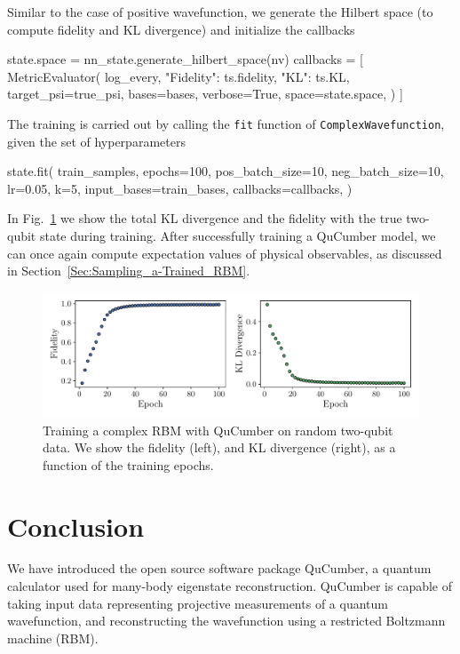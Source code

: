 \documentclass[submission, Phys, hidelnks]{SciPost}
\begin{document}
Similar to the case of positive wavefunction, we generate the Hilbert space (to
compute fidelity and KL divergence) and initialize the callbacks
\begin{python}
state.space = nn_state.generate_hilbert_space(nv)
callbacks = [
  MetricEvaluator(
    log_every,
    {"Fidelity": ts.fidelity, "KL": ts.KL},
    target_psi=true_psi,
    bases=bases,
    verbose=True,
    space=state.space,
  )
]

\end{python}
The training is carried out by calling the \verb|fit| function of
\verb|ComplexWavefunction|, given the set of hyperparameters
\begin{python}
state.fit(
    train_samples,
    epochs=100,
    pos_batch_size=10,
    neg_batch_size=10,
    lr=0.05,
    k=5,
    input_bases=train_bases,
    callbacks=callbacks,
)
\end{python}
In Fig.~\ref{fig:complex} we show the total KL divergence and the fidelity with
the true two-qubit state during training.
After successfully training a QuCumber model, we can once again compute
expectation values of physical observables,
as discussed in Section~\ref{Sec:Sampling_a-Trained_RBM}.
\begin{figure}[htb]
    \centering{}
    \includegraphics[width=\textwidth, trim={0 15 0 0}, clip]{complex_fid_KL.pdf}
    \caption{
        Training a complex RBM with QuCumber on random two-qubit data. We
        show the fidelity (left), and KL divergence (right), as a function of
        the training epochs.
    }\label{fig:complex}
\end{figure}

\section{Conclusion}

We have introduced the open source software package QuCumber, a quantum
calculator used for many-body eigenstate reconstruction. QuCumber is capable
of taking input data representing projective measurements of a quantum
wavefunction, and reconstructing the wavefunction using a restricted Boltzmann
machine (RBM).
\end{document}
